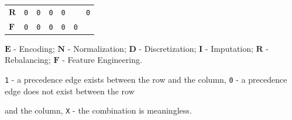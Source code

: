 \begin{table}[!t]
\begin{center}
{\begin{tabular}{@{}lcccccc}
    $\boldsymbol{R}$ & \texttt{0} & \texttt{0} & \texttt{0} & \texttt{0} & \cellcolor{gray!25}  & \texttt{0} \\	\cmidrule[.1em]{1-7}
    $\boldsymbol{F}$ & \texttt{0} & \texttt{0} & \texttt{0} & \texttt{0} & \texttt{0} & \cellcolor{gray!25}
    \\	\bottomrule
    \end{tabular}}
    \qquad%
    \end{center}
    \begin{tablenotes}
    \centering
    \scriptsize
    \item$\boldsymbol{E}$ - Encoding; $\boldsymbol{N}$ - Normalization; $\boldsymbol{D}$ - Discretization; $\boldsymbol{I}$ - Imputation; $\boldsymbol{R}$ - Rebalancing; $\boldsymbol{F}$ - Feature Engineering. \item \texttt{1} - a precedence edge exists between the row and the column, \texttt{0} - a precedence edge does not exist between the row 
    \item and the column, \texttt{X} - the combination is meaningless.
    \end{tablenotes}
    \label{tbl:rules}
    \end{table}

